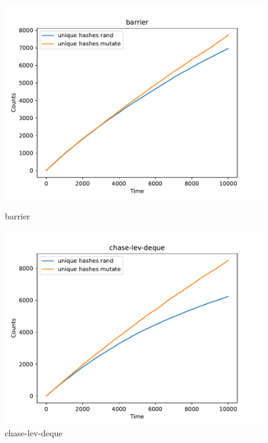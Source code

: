 \begin{figure}[H]
    
    \centering
    \begin{minipage}{0.45\textwidth}
        \centering
        \includegraphics[width=\textwidth]{figure/barrier.pdf}
        \caption{barrier}
        \label{cover-plot1-barrier}
    \end{minipage}
    \hfill
    \begin{minipage}{0.45\textwidth}
        \centering
        \includegraphics[width=\textwidth]{figure/chase-lev-deque.pdf}
        \caption{chase-lev-deque}
        \label{cover-plot1-chase-lev-deque}
    \end{minipage}
    

\end{figure}

